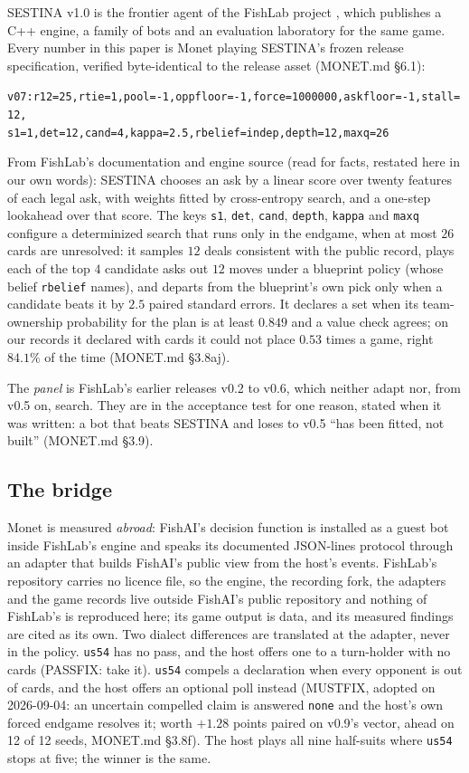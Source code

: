 \documentclass[11pt]{article}
\newcommand{\code}[1]{\texttt{#1}}
\newcommand{\usff}{\code{us54}}
\newcommand{\monet}{MONET.md}
\newcommand{\sect}[1]{\S#1}
\begin{document}
SESTINA v1.0 is the frontier agent of the FishLab project \cite{fishlab}, which publishes a C++ engine,
a family of bots and an evaluation laboratory for the same game. Every number in this paper is Monet
playing SESTINA's frozen release specification, verified byte-identical to the release asset
(\monet{} \sect{6.1}):
\begin{center}
\small\code{v07:r12=25,rtie=1,pool=-1,oppfloor=-1,force=1000000,askfloor=-1,stall=12,}\\
\small\code{s1=1,det=12,cand=4,kappa=2.5,rbelief=indep,depth=12,maxq=26}
\end{center}
From FishLab's documentation and engine source (read for facts, restated here in our own words):
SESTINA chooses an ask by a linear score over twenty features of each legal ask, with weights fitted by
cross-entropy search, and a one-step lookahead over that score. The keys \code{s1}, \code{det},
\code{cand}, \code{depth}, \code{kappa} and \code{maxq} configure a determinized search that runs only
in the endgame, when at most $26$ cards are unresolved: it samples $12$ deals consistent with the
public record, plays each of the top $4$ candidate asks out $12$ moves under a blueprint policy (whose
belief \code{rbelief} names), and departs from the blueprint's own pick only when a candidate beats it
by $2.5$ paired standard errors. It declares a set when its team-ownership probability for the plan
is at least $0.849$ and a value check agrees; on our records it declared with cards it could not place
$0.53$ times a game, right $84.1\%$ of the time (\monet{} \sect{3.8aj}).

The \emph{panel} is FishLab's earlier releases v0.2 to v0.6, which neither adapt nor, from v0.5 on,
search. They are in the acceptance test for one reason, stated when it was written: a bot that beats
SESTINA and loses to v0.5 ``has been fitted, not built'' (\monet{} \sect{3.9}).

\subsection{The bridge}
\label{sec:bridge}

Monet is measured \emph{abroad}: FishAI's decision function is installed as a guest bot inside
FishLab's engine and speaks its documented JSON-lines protocol through an adapter that builds FishAI's
public view from the host's events. FishLab's repository carries no licence file, so the engine, the
recording fork, the adapters and the game records live outside FishAI's public repository and nothing
of FishLab's is reproduced here; its game output is data, and its measured findings are cited as its
own. Two dialect differences are translated at the adapter, never in the policy. \usff{} has no pass,
and the host offers one to a turn-holder with no cards (PASSFIX: take it). \usff{} compels a declaration
when every opponent is out of cards, and the host offers an optional poll instead (MUSTFIX, adopted on
2026-09-04: an uncertain compelled claim is answered \code{none} and the host's own forced endgame
resolves it; worth $+1.28$ points paired on v0.9's vector, ahead on 12 of 12 seeds, \monet{}
\sect{3.8f}). The host plays all nine half-suits where \usff{} stops at five; the winner is the same.
\end{document}
